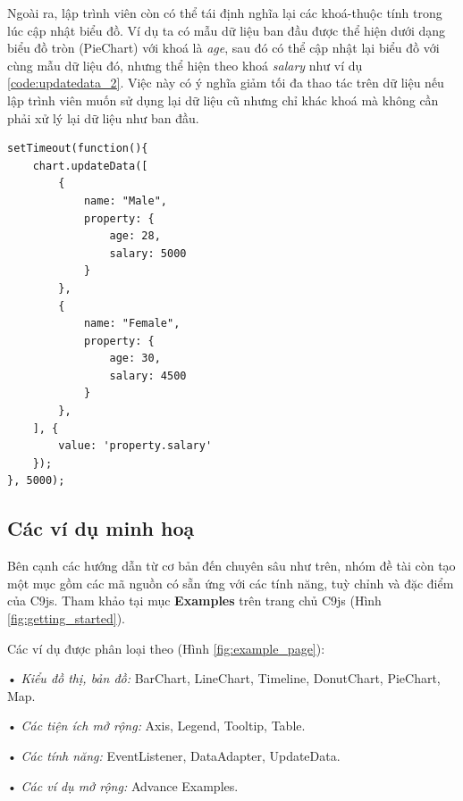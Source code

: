 \documentclass[12pt,a4paper]{article}
\begin{document}
Ngoài ra, lập trình viên còn có thể tái định nghĩa lại các khoá-thuộc tính trong lúc cập nhật biểu đồ. Ví dụ ta có mẫu dữ liệu ban đầu được thể hiện dưới dạng biểu đồ tròn (PieChart) với khoá là \textit{age}, sau đó có thể cập nhật lại biểu đồ với cùng mẫu dữ liệu đó, nhưng thể hiện theo khoá \textit{salary} như ví dụ \ref{code:updatedata_2}. Việc này có ý nghĩa giảm tối đa thao tác trên dữ liệu nếu lập trình viên muốn sử dụng lại dữ liệu cũ nhưng chỉ khác khoá mà không cần phải xử lý lại dữ liệu như ban đầu.

\begin{lstlisting}[caption=Định nghĩa lại khoá-thuộc tính trong lúc cập nhật, label={code:updatedata_2}]
setTimeout(function(){
    chart.updateData([
        {
            name: "Male", 
            property: {
                age: 28,
                salary: 5000
            }
        },
        {
            name: "Female", 
            property: {
                age: 30,
                salary: 4500
            }
        },
    ], {
        value: 'property.salary'
    });
}, 5000);
\end{lstlisting}

\subsection{Các ví dụ minh hoạ}
Bên cạnh các hướng dẫn từ cơ bản đến chuyên sâu như trên, nhóm đề tài còn tạo một mục gồm các mã nguồn có sẵn ứng với các tính năng, tuỳ chỉnh và đặc điểm của C9js. Tham khảo tại mục \textbf{Examples} trên trang chủ C9js (Hình \ref{fig:getting_started}). 

Các ví dụ được phân loại theo (Hình \ref{fig:example_page}):

\begin{list}{}{}
\item[•] \emph{Kiểu đồ thị, bản đồ:} BarChart, LineChart, Timeline, DonutChart, PieChart, Map.
\item[•] \emph{Các tiện ích mở rộng:} Axis, Legend, Tooltip, Table.
\item[•] \emph{Các tính năng:} EventListener, DataAdapter, UpdateData.
\item[•] \emph{Các ví dụ mở rộng:} Advance Examples.
\end{list}
\end{document}
